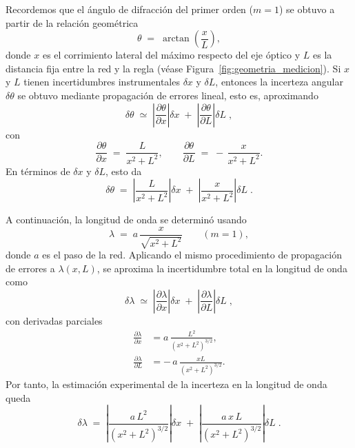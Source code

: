 \documentclass[11pt,twocolumn]{article}
\begin{document}
Recordemos que el ángulo de difracción del primer orden ($m=1$) se obtuvo a partir de la relación geométrica
\begin{equation*}
    \theta \;=\; \arctan\!\left(\frac{x}{L}\right),
\end{equation*}
donde $x$ es el corrimiento lateral del máximo respecto del eje óptico y $L$ es la distancia fija entre la red y la regla (véase Figura~\ref{fig:geometria_medicion}). Si $x$ y $L$ tienen incertidumbres instrumentales $\delta x$ y $\delta L$, entonces la incerteza angular $\delta\theta$ se obtuvo mediante propagación de errores lineal, esto es, aproximando
\[
    \delta\theta \;\simeq\;
    \left| \frac{\partial \theta}{\partial x} \right| \delta x
    \;+\;
    \left| \frac{\partial \theta}{\partial L} \right| \delta L \;,
\]
con
\begin{equation*}
    \frac{\partial \theta}{\partial x}
    \;=\;
    \frac{L}{x^2 + L^2},
    \qquad
    \frac{\partial \theta}{\partial L}
    \;=\;
    -\,\frac{x}{x^2 + L^2}.
\end{equation*}
En términos de $\delta x$ y $\delta L$, esto da
\begin{equation}
    \delta \theta \;=\;
    \left|\frac{L}{x^2+L^2}\right| \delta x
    \;+\;
    \left|\frac{x}{x^2+L^2}\right| \delta L \;.
    \label{eq:error_theta}
\end{equation}

A continuación, la longitud de onda se determinó usando
\begin{equation*}
    \lambda
    \;=\;
    a\,\frac{x}{\sqrt{x^{2}+L^{2}}}
    \qquad (m=1),
\end{equation*}
donde $a$ es el paso de la red. Aplicando el mismo procedimiento de propagación de errores a $\lambda(x,L)$, se aproxima la incertidumbre total en la longitud de onda como
\[
    \delta\lambda \;\simeq\;
    \left| \frac{\partial \lambda}{\partial x} \right| \delta x
    \;+\;
    \left| \frac{\partial \lambda}{\partial L} \right| \delta L \;,
\]
con derivadas parciales
\begin{align*}
    \frac{\partial \lambda}{\partial x}
    &=
    a\,\frac{L^2}{\left(x^2+L^2\right)^{3/2}},\\[4pt]
    \frac{\partial \lambda}{\partial L}
    &=
    -\,a\,\frac{xL}{\left(x^2+L^2\right)^{3/2}}.
\end{align*}
Por tanto, la estimación experimental de la incerteza en la longitud de onda queda
\begin{equation}
    \delta \lambda \;=\;
    \left|
        \frac{a\,L^2}{\left(x^2+L^2\right)^{3/2}}
    \right|\delta x
    \;+\;
    \left|
        \frac{a\,x\,L}{\left(x^2+L^2\right)^{3/2}}
    \right|\delta L \;.
    \label{eq:error_lambda}
\end{equation}
\end{document}
